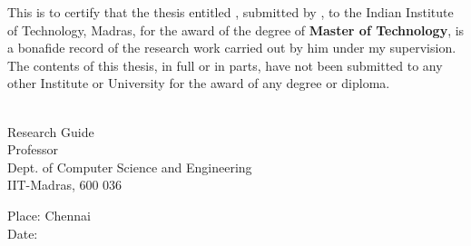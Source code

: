 \certificate
\vspace*{0.5in}
\noindent This is to certify that the thesis entitled {\bf {\thesistitle}}, 
submitted by {\bf {\thesisauthor}}, to the Indian Institute of Technology, 
Madras, for the award of the degree of {\bf Master of Technology}, 
is a bonafide record of the research work carried out by him under my
supervision. The contents of this thesis, in full or in parts, have not been
submitted to any other Institute or University for the award of any degree or diploma.
\vspace*{1.4in}
\hspace*{-0.25in}
\begin{singlespace}
 \\
\noindent Research Guide \\ 
\noindent Professor \\
\noindent Dept. of Computer Science and Engineering\\
\noindent IIT-Madras, 600 036 \\
\end{singlespace}
\vspace*{0.20in}
\noindent Place: Chennai\\ 
Date:

